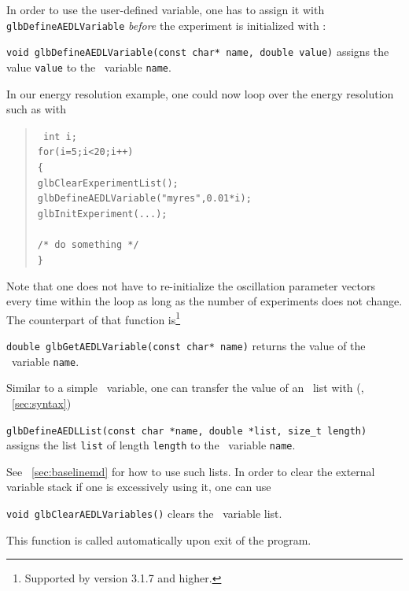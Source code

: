 In order to use the user-defined variable, one has to assign it 
with {\tt glbDefineAEDLVariable} {\em before} the experiment is initialized with :
\begin{function}
{\tt void glbDefineAEDLVariable(const char* name, double value)}
assigns the value {\tt value} to the \AEDL\ variable {\tt name}.
\end{function}
In our energy resolution example, one could now loop over the
energy resolution such as with
\begin{quote}
{\tt
int i; \\
for(i=5;i<20;i++) \\
\{ \\    
\hspace*{1cm} glbClearExperimentList(); \\
\hspace*{1cm} glbDefineAEDLVariable("myres",0.01*i); \\
\hspace*{1cm} glbInitExperiment(...); \\
\\
\hspace*{1cm} /* do something */ \\
\}
}
\end{quote}
Note that one does not have to re-initialize the oscillation
parameter vectors every time within the loop as long as the
number of experiments does not change. The counterpart of that
function is\footnote{Supported by version 3.1.7 and higher.}
\begin{function}
{\tt double glbGetAEDLVariable(const char* name)}
returns the value of the \AEDL\ variable {\tt name}.
\end{function}

Similar to a simple \AEDL\ variable, one can transfer the value of an
\AEDL\ list with (\cf, \Sec~\ref{sec:syntax})
\begin{function}
{\tt glbDefineAEDLList(const char *name, double *list, size\_t length)} assigns the list {\tt list}
of length {\tt length} to the \AEDL\ variable {\tt name}.
\end{function}
See \Sec~\ref{sec:baselinemd} for how to use such lists.
%
In order to clear the external variable stack if one is
excessively using it, one can use
\begin{function}
{\tt void glbClearAEDLVariables()}
clears the \AEDL\ variable list.
\end{function}
This function is called automatically upon exit of the program.

